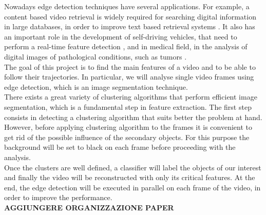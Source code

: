 \documentclass{article}
\begin{document}
{Nowadays edge detection techniques have several applications. For example, a content based video retrieval is widely required for searching digital information in large databases, in order to improve text based retrieval systems \cite{1}. It also has an important role in the development of self-driving vehicles, that need to perform a real-time feature detection \cite{2}, and in medical field, in the analysis of digital images of pathological conditions, such as tumors \cite{3}. \\
The goal of this project is to find the main features of a video and to be able to follow their trajectories. In particular, we will analyse single video frames using edge detection, which is an image segmentation technique. \\
There exists a great variety of clustering algorithms that perform efficient image segmentation, which is a fundamental step in feature extraction. The first step consists in detecting a clustering algorithm that suits better the problem at hand. 
However, before applying clustering algorithm to the frames it is convenient to get rid of the possible influence of the secondary objects. For this purpose the background will be set to black on each frame before proceeding with the analysis. \\
Once the clusters are well defined, a classifier will label the objects of our interest and finally the video will be reconstructed with only its critical features. At the end, the edge detection will be executed in parallel on each frame of the video, in order to improve the performance. \\
\textbf{AGGIUNGERE ORGANIZZAZIONE PAPER}


}
\end{document}
